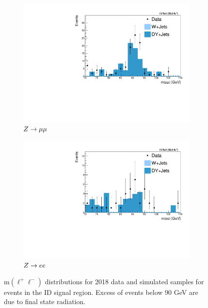 \begin{figure}[htb!]
	\centering
	\captionsetup[subfigure]{justification=centering}
	\begin{subfigure}[h]{0.45\linewidth}
		\centering
		\includegraphics[width=\linewidth]{figs/05_analysis/2018_ZX_Z_mass_MU_preselection_tight.pdf}
		\caption{$Z\to\mu\mu$}
	\end{subfigure}
	\begin{subfigure}[h]{0.45\linewidth}
		\centering
		\includegraphics[width=\linewidth]{figs/05_analysis/2018_ZX_Z_mass_ELE_preselection_tight.pdf}
		\caption{$Z\to ee$}
	\end{subfigure}
	\caption[m$\left(\ell^+\ell^-\right)$ distributions for 2018 data and simulated samples for events in the ID signal region. Excess of events below 90 GeV are due to final state radiation.]{m$\left(\ell^+\ell^-\right)$ distributions for 2018 data and simulated samples for events in the ID signal region. Excess of events below 90 GeV are due to final state radiation.}
	\label{fig:zmass2018_preselection_tight}
\end{figure}

